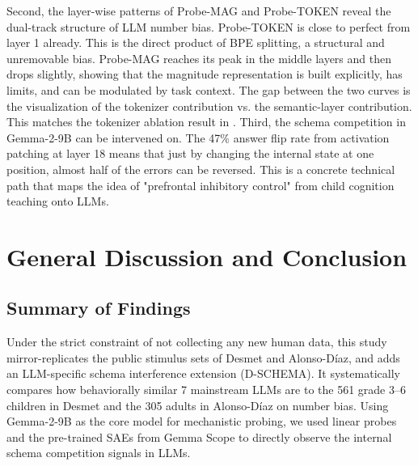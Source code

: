 Second, the layer-wise patterns of Probe-MAG and Probe-TOKEN reveal the dual-track structure of LLM number bias. Probe-TOKEN is close to perfect from layer 1 already. This is the direct product of BPE splitting, a structural and unremovable bias. Probe-MAG reaches its peak in the middle layers and then drops slightly, showing that the magnitude representation is built explicitly, has limits, and can be modulated by task context. The gap between the two curves is the visualization of the tokenizer contribution vs. the semantic-layer contribution. This matches the tokenizer ablation result in \cite{singh2024}. Third, the schema competition in Gemma-2-9B can be intervened on. The 47\% answer flip rate from activation patching at layer 18 means that just by changing the internal state at one position, almost half of the errors can be reversed. This is a concrete technical path that maps the idea of "prefrontal inhibitory control" from child cognition teaching onto LLMs.

\section{General Discussion and Conclusion}

\subsection{Summary of Findings}

Under the strict constraint of not collecting any new human data, this study mirror-replicates the public stimulus sets of Desmet\cite{desmet2010} and Alonso-Díaz\cite{alonsodaz2018}, and adds an LLM-specific schema interference extension (D-SCHEMA). It systematically compares how behaviorally similar 7 mainstream LLMs are to the 561 grade 3–6 children in Desmet and the 305 adults in Alonso-Díaz on number bias. Using Gemma-2-9B as the core model for mechanistic probing, we used linear probes and the pre-trained SAEs from Gemma Scope to directly observe the internal schema competition signals in LLMs.

